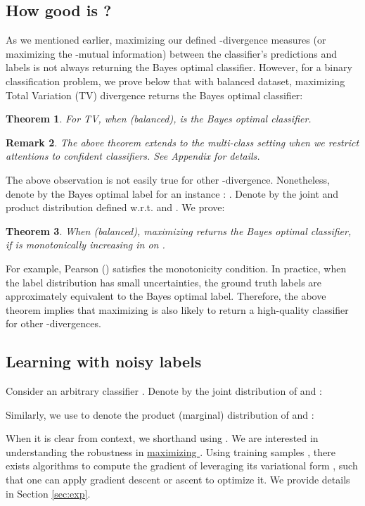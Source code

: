 \documentclass{article}
\newtheorem{theorem}{Theorem}
\newtheorem{remark}[theorem]{Remark}
\begin{document}
\subsection{How good is ?}
\label{sec:hf}

As we mentioned earlier, maximizing our defined -divergence measures (or maximizing the -mutual information) between the classifier's predictions and labels is not always returning the Bayes optimal classifier. However, for a binary classification problem, we prove below that with balanced dataset,  maximizing Total Variation (TV) divergence returns the Bayes optimal classifier:

\begin{theorem}\label{thm:TV}
For TV, when  (balanced), 
 is the Bayes optimal classifier. 
\end{theorem}
\begin{remark}
The above theorem extends to the multi-class setting when we restrict attentions to confident classifiers. See Appendix for details.
\end{remark}
\vspace{-0.03in}
The above observation is not easily true for other -divergence. Nonetheless, denote by  the Bayes optimal label for an instance : . Denote by  the joint and product distribution  defined w.r.t.  and . We prove:
\begin{theorem}\label{thm:bayes}
When  (balanced), maximizing  returns the Bayes optimal classifier, if  is monotonically increasing in  on .
\end{theorem}
\vspace{-0.03in}
For example, Pearson  () satisfies the monotonicity condition.
In practice, when the label distribution  has small uncertainties, the ground truth labels are approximately equivalent to the Bayes optimal label. Therefore, the above theorem implies that maximizing  is also likely to return a high-quality classifier for other -divergences.

 
\subsection{Learning with noisy labels}
 Consider an arbitrary classifier . Denote by  the joint distribution of  and :

\vspace{-0.03in}
Similarly, we use  to denote the product (marginal) distribution of  and :

\vspace{-0.03in}
When it is clear from context, we shorthand using . We are interested in understanding the robustness in \underline{maximizing }. Using training samples , there exists algorithms to compute the gradient of  leveraging its variational form \citep{nowozin2016f}, such that one can apply gradient descent or ascent to optimize it. We provide details in Section \ref{sec:exp}.
\end{document}
